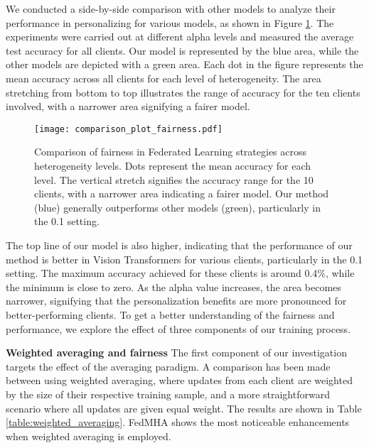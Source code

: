 We conducted a side-by-side comparison with other models to analyze their performance in personalizing for various models, as shown in Figure \ref{fig:fairness_comparison}. The experiments were carried out at different alpha levels and measured the average test accuracy for all clients. Our model is represented by the blue area, while the other models are depicted with a green area. Each dot in the figure represents the mean accuracy across all clients for each level of heterogeneity. The area stretching from bottom to top illustrates the range of accuracy for the ten clients involved, with a narrower area signifying a fairer model. 
\begin{figure}[htbp]
\centering
\texttt{[image: comparison\_plot\_fairness.pdf]}
\caption{Comparison of fairness in Federated Learning strategies across heterogeneity levels. Dots represent the mean accuracy for each level. The vertical stretch signifies the accuracy range for the 10 clients, with a narrower area indicating a fairer model. Our method (blue) generally outperforms other models (green), particularly in the 0.1 setting.}
\label{fig:fairness_comparison}
\end{figure}
The top line of our model is also higher, indicating that the performance of our method is  better in Vision Transformers for various clients, particularly in the 0.1 setting. The maximum accuracy achieved for these clients is around 0.4\%, while the minimum is close to zero. As the alpha value increases, the area becomes narrower, signifying that the personalization benefits are more pronounced for better-performing clients. To get a better understanding of the fairness and performance, we explore the effect of three components of our training process.

\textbf{Weighted averaging and fairness} The first component of our investigation targets the effect of the averaging paradigm. A comparison has been made between using weighted averaging, where updates from each client are weighted by the size of their respective training sample, and a more straightforward scenario where all updates are given equal weight. The results are shown in Table \ref{table:weighted_averaging}. FedMHA shows the most noticeable enhancements when weighted averaging is employed.

